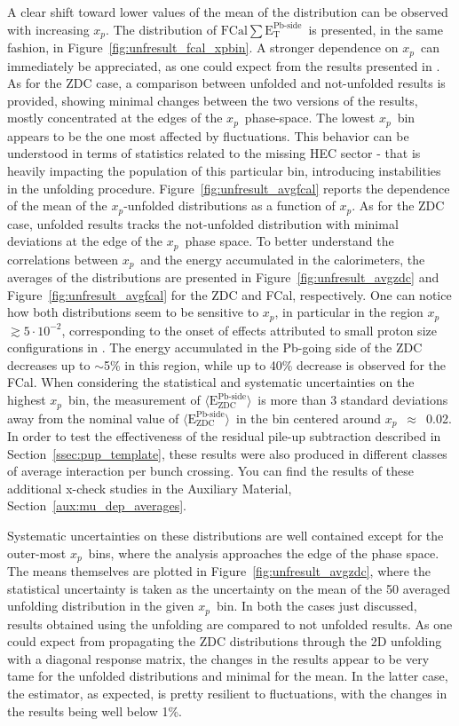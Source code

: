 \documentclass[NOTE, atlasdraft=true, texlive=2020, UKenglish]{atlasdoc}
\newcommand{\AZDC}{$\langle \text{E}_\text{ZDC}^\text{Pb-side} \rangle$}
\newcommand{\ETPB}{$\text{FCal} \sum \text{E}_{\text{T}}^{\text{Pb-side} }$}
\newcommand{\xp}{$x_{p}$}
\begin{document}
A clear shift toward lower values of the mean of the distribution can be observed with increasing \xp. The distribution of \ETPB\ is presented, in the same fashion, in Figure~\ref{fig:unfresult_fcal_xpbin}. A stronger dependence on \xp\ can immediately be appreciated, as one could expect from the results presented in \cite{ATLAS:2023zfx}. As for the ZDC case, a comparison between unfolded and not-unfolded results is provided, showing minimal changes between the two versions of the results, mostly concentrated at the edges of the \xp\ phase-space. The lowest \xp\ bin appears to be the one most affected by fluctuations. This behavior can be understood in terms of statistics related to the missing HEC sector - that is heavily impacting the population of this particular bin, introducing instabilities in the unfolding procedure. Figure~\ref{fig:unfresult_avgfcal} reports the dependence of the mean of the \xp-unfolded distributions as a function of \xp. As for the ZDC case, unfolded results tracks the not-unfolded distribution with minimal deviations at the edge of the \xp\ phase space. To better understand the correlations between \xp\ and the energy accumulated in the calorimeters, the averages of the distributions are presented in Figure~\ref{fig:unfresult_avgzdc} and Figure~\ref{fig:unfresult_avgfcal} for the ZDC and FCal, respectively. 
One can notice how both distributions seem to be sensitive to \xp, in particular in the region \xp $\gtrsim 5\cdot10^{-2}$, corresponding to the onset of effects attributed to small proton size configurations in \cite{ATLAS:2023zfx}. The energy accumulated in the Pb-going side of the ZDC decreases up to $\sim$5\% in this region, while up to 40\% decrease is observed for the FCal. 
When considering the statistical and systematic uncertainties on the highest \xp\ bin, the measurement of \AZDC\ is more than 3 standard deviations away from the nominal value of \AZDC\ in the bin centered around \xp~$\approx$~0.02.
In order to test the effectiveness of the residual pile-up subtraction described in Section~\ref{ssec:pup_template}, these results were also produced in different classes of average interaction per bunch crossing. You can find the results of these additional x-check studies in the Auxiliary Material, Section~\ref{aux:mu_dep_averages}.

Systematic uncertainties on these distributions are well contained except for the outer-most \xp\ bins, where the analysis approaches the edge of the phase space. The means themselves are plotted in Figure~\ref{fig:unfresult_avgzdc}, where the statistical uncertainty is taken as the uncertainty on the mean of the 50 averaged unfolding distribution in the given \xp\ bin. In both the cases just discussed, results obtained using the unfolding are compared to not unfolded results. As one could expect from propagating the ZDC distributions through the 2D unfolding with a diagonal response matrix, the changes in the results appear to be very tame for the unfolded distributions and minimal for the mean. 
In the latter case, the estimator, as expected, is pretty resilient to fluctuations, with the changes in the results being well below 1\%.
\end{document}
